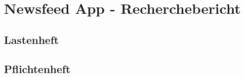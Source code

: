 \section{Newsfeed App - Recherchebericht}
\label{section:realisation:newsfeed_app}

\subsection{Lastenheft}

\subsection{Pflichtenheft}